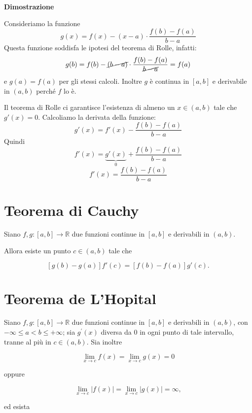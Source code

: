 \textbf{Dimostrazione}

Consideriamo la funzione
\begin{equation*}
g(x) = f(x) - (x-a) \cdot \frac{f(b)-f(a)}{b-a}
\end{equation*}
Questa funzione soddisfa le ipotesi del teorema di Rolle, infatti:
\begin{equation*}
g(b) = f(b) - \cancel{(b-a)} \cdot \frac{f(b)-f(a)}{\cancel{b-a}} = f(a)
\end{equation*} 
e $g(a) = f(a)$ per gli stessi calcoli. Inoltre $g$ è continua in $[a,b]$ e derivabile in $(a,b)$ perché $f$ lo è.

Il teorema di Rolle ci garantisce l'esistenza di almeno un $x \in (a,b)$ tale che $g'(x)=0$. Calcoliamo la derivata della funzione:
\begin{equation*}
g'(x) = f'(x) - \frac{f(b)-f(a)}{b-a}
\end{equation*}
Quindi
\begin{equation*}
f'(x) = \underbrace{g'(x)}_{0} + \frac{f(b)-f(a)}{b-a}
\end{equation*}
\begin{equation*}
f'(x) = \frac{f(b)-f(a)}{b-a}
\end{equation*}

\section{Teorema di Cauchy}
Siano $f, g : [a,b] \to \mathbb{R}$ due funzioni continue in $[a,b]$ e derivabili in $(a,b)$. 

Allora esiste un punto $c\in (a,b)$ tale che

$$[g(b)-g(a)]f'(c) = [f(b) - f(a)]g'(c).$$

\section{Teorema de L'Hopital}

Siano $f, g : [a,b] \rightarrow \mathbb{R}$ due funzioni continue in $[a,b]$ e derivabili in $(a,b)$, con $-\infty \leq a < b \leq +\infty$; sia $g^{\prime}(x)$ diversa da 0 in ogni punto di tale intervallo, tranne al più in $c \in (a,b)$. Sia inoltre

$$\lim_{x\to c}{f(x)} = \lim_{x\to c}g(x) = 0$$

oppure 

$$\lim_{x\to c}{|f(x)|} = \lim_{x\to c}{|g(x)|} = \infty,$$

ed esista 

